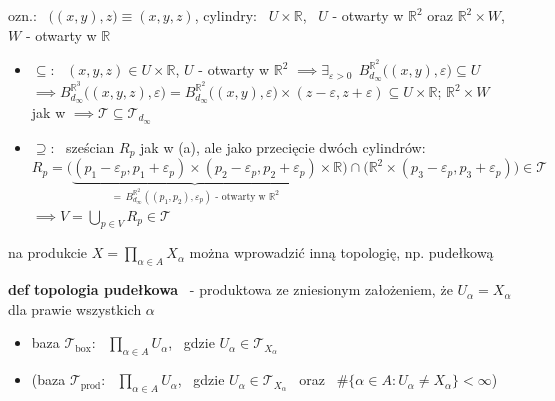 \documentclass[a4paper,12pt]{article}
\begin{document}
\begin{podpunkty}
    \smallskip
    ozn.: \, \(\big((x, y), z\big) \equiv (x, y, z)\), \; cylindry: \, \(U \times \mathbb{R}\), \, \(U\) - otwarty w \(\mathbb{R}^2\) \; oraz \; \(\mathbb{R}^2 \times W\), \, \(W\) - otwarty w \(\mathbb{R}\)
    \begin{itemize}
        \item \(\subseteq\): \, \((x, y, z) \in U \times \mathbb{R}\), \; \(U\) - otwarty w \(\mathbb{R}^2\) \(\implies \exists_{\varepsilon > 0} \;\, B^{\mathbb{R}^2}_{d_\infty}\big((x, y), \varepsilon\big) \subseteq U\) \\
        \(\implies B^{\mathbb{R}^3}_{d_\infty}\big((x, y, z), \varepsilon\big) = B^{\mathbb{R}^2}_{d_\infty}\big((x, y), \varepsilon\big) \times (z - \varepsilon, z + \varepsilon) \subseteq U \times \mathbb{R}\); \; \(\mathbb{R}^2 \times W\) jak w  \(\implies \mathcal{T} \subseteq \mathcal{T}_{d_\infty}\)
        \item \(\supseteq\): \, sześcian \(R_p\) jak w (a), ale jako przecięcie dwóch cylindrów:
        \[
        R_p = \big(\underbrace{(p_1 - \varepsilon_p, p_1 + \varepsilon_p) \times (p_2 - \varepsilon_p, p_2 + \varepsilon_p)}_{= \, B^{\mathbb{R}^2}_{d_\infty}((p_1, p_2), \varepsilon_p) \text{ - otwarty w } \mathbb{R}^2} \times \mathbb{R}\big) \cap \big(\mathbb{R}^2 \times (p_3 - \varepsilon_p, p_3 + \varepsilon_p)\big) \in \mathcal{T}
        \]
        \(\implies V = \bigcup_{p \in V} R_p \in \mathcal{T}\)
    \end{itemize}
\end{podpunkty}

\newpage
{}


na produkcie \(X = \prod_{\alpha \in A} X_\alpha\) można wprowadzić inną topologię, np. pudełkową

\smallskip
\textbf{def} \; \textbf{topologia pudełkowa} \, - produktowa ze zniesionym założeniem, że \(U_\alpha = X_\alpha\) dla prawie wszystkich \(\alpha\)
\begin{itemize}
    \item baza \(\mathcal{T}_{\text{box}}\): \, \(\prod_{\alpha \in A} U_\alpha\), \, gdzie \(U_\alpha \in \mathcal{T}_{X_\alpha}\)
    \item (baza \(\mathcal{T}_{\text{prod}}\): \, \(\prod_{\alpha \in A} U_\alpha\), \, gdzie \(U_\alpha \in \mathcal{T}_{X_\alpha}\) \, oraz \, \(\#\{\alpha \in A : U_\alpha \neq X_\alpha\} < \infty\))
\end{itemize}
\end{document}
